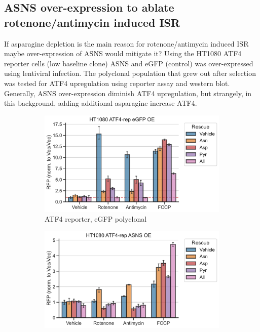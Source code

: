 \FloatBarrier
\subsection{ASNS over-expression to ablate rotenone/antimycin induced ISR}
If asparagine depletion is the main reason for rotenone/antimycin induced ISR maybe over-expression of ASNS would mitigate it?
Using the HT1080 ATF4 reporter cells (low baseline clone) ASNS and eGFP (control) was over-expressed using lentiviral infection.
The polyclonal population that grew out after selection was tested for ATF4 upregulation using reporter assay and western blot.
Generally, ASNS over-expression diminish ATF4 upregulation, but strangely, in this background, adding additional asparagine increase ATF4.

\begin{figure}
     \centering
     \begin{subfigure}[b]{0.49\textwidth}
         \includegraphics[width=\textwidth]{figures/sapp/ISR/HT1080_ATF4rep_eGFP_OE.pdf}
         \caption{ATF4 reporter, eGFP polyclonal}
         \label{fig:sapp:ISR:HT1080_ATF4rep_eGFP_OE}
     \end{subfigure}
     \hfill
     \begin{subfigure}[b]{0.49\textwidth}
         \includegraphics[width=\textwidth]{figures/sapp/ISR/HT1080_ATF4rep_ASNS_OE.pdf}

\end{subfigure}
\end{figure}
